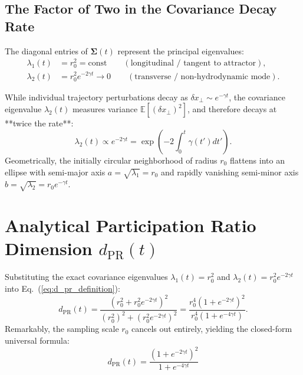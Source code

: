 \documentclass[11pt,a4paper]{article}
\begin{document}
\subsection{The Factor of Two in the Covariance Decay Rate}
The diagonal entries of $\mathbf{\Sigma}(t)$ represent the principal eigenvalues:
\begin{align}
    \lambda_1(t) &= r_0^2 = \mathrm{const} \qquad (\text{longitudinal / tangent to attractor}), \label{eq:lambda1_t}\\
    \lambda_2(t) &= r_0^2 e^{-2\gamma t} \to 0 \qquad (\text{transverse / non-hydrodynamic mode}). \label{eq:lambda2_t}
\end{align}
\begin{tcolorbox}[colback=red!5!white,colframe=red!75!black,title=\textbf{Crucial Distinction: Trajectory Deviation vs. Covariance Eigenvalue}]
While individual trajectory perturbations decay as $\delta x_\perp \sim e^{-\gamma t}$, the covariance eigenvalue $\lambda_2(t)$ measures variance $\mathbb{E}[(\delta x_\perp)^2]$, and therefore decays at **twice the rate**:
\begin{equation}
    \lambda_2(t) \propto e^{-2\gamma t} = \exp\left(-2 \int_0^t \gamma(t') dt'\right).
\end{equation}
Geometrically, the initially circular neighborhood of radius $r_0$ flattens into an ellipse with semi-major axis $a = \sqrt{\lambda_1} = r_0$ and rapidly vanishing semi-minor axis $b = \sqrt{\lambda_2} = r_0 e^{-\gamma t}$.
\end{tcolorbox}

\section{Analytical Participation Ratio Dimension \texorpdfstring{$d_{\mathrm{PR}}(t)$}{d\_PR(t)}}
\label{sec:analytical_pr}
Substituting the exact covariance eigenvalues $\lambda_1(t) = r_0^2$ and $\lambda_2(t) = r_0^2 e^{-2\gamma t}$ into Eq.~(\ref{eq:d_pr_definition}):
\begin{equation}
    d_{\mathrm{PR}}(t) = \frac{\left(r_0^2 + r_0^2 e^{-2\gamma t}\right)^2}{\left(r_0^2\right)^2 + \left(r_0^2 e^{-2\gamma t}\right)^2} = \frac{r_0^4 \left(1 + e^{-2\gamma t}\right)^2}{r_0^4 \left(1 + e^{-4\gamma t}\right)}.
\end{equation}
Remarkably, the sampling scale $r_0$ cancels out entirely, yielding the closed-form universal formula:
\begin{equation}
    \boxed{d_{\mathrm{PR}}(t) = \frac{\left(1 + e^{-2\gamma t}\right)^2}{1 + e^{-4\gamma t}}}
    \label{eq:d_pr_analytical_formula}
\end{equation}
\end{document}
